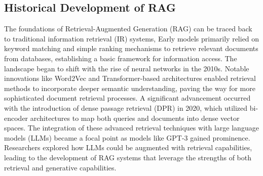 \subsection{Historical Development of RAG}
The foundations of Retrieval-Augmented Generation (RAG) can be traced back to traditional information retrieval (IR) systems,  Early models primarily relied on keyword matching and simple ranking mechanisms to retrieve relevant documents from databases, establishing a basic framework for information access. The landscape began to shift with the rise of neural networks in the 2010s. Notable innovations like Word2Vec and Transformer-based architectures enabled retrieval methods to incorporate deeper semantic understanding, paving the way for more sophisticated document retrieval processes.
A significant advancement occurred with the introduction of dense passage retrieval (DPR) in 2020, which utilized bi-encoder architectures to map both queries and documents into dense vector spaces. 
The integration of these advanced retrieval techniques with large language models (LLMs) became a focal point as models like GPT-3 gained prominence. Researchers explored how LLMs could be augmented with retrieval capabilities, leading to the development of RAG systems that leverage the strengths of both retrieval and generative capabilities\cite{gao2024retrieval}.
